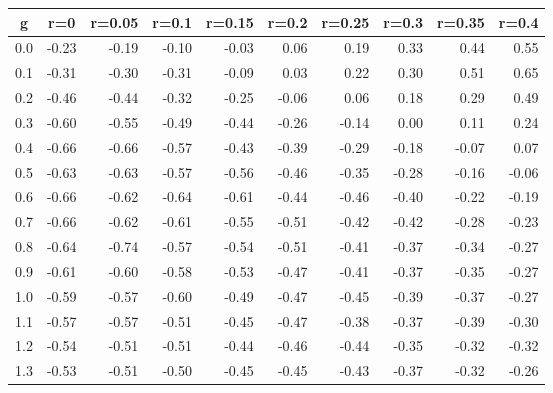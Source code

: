 %
\begin{table}[!tbp]
 \begin{center}
 \begin{tabular}{rrrrrrrrrr}\hline\hline
\multicolumn{1}{c}{g}&\multicolumn{1}{c}{r=0}&\multicolumn{1}{c}{r=0.05}&\multicolumn{1}{c}{r=0.1}&\multicolumn{1}{c}{r=0.15}&\multicolumn{1}{c}{r=0.2}&\multicolumn{1}{c}{r=0.25}&\multicolumn{1}{c}{r=0.3}&\multicolumn{1}{c}{r=0.35}&\multicolumn{1}{c}{r=0.4}\tabularnewline
\hline
0.0&-0.23&-0.19&-0.10&-0.03& 0.06& 0.19& 0.33& 0.44& 0.55\tabularnewline
0.1&-0.31&-0.30&-0.31&-0.09& 0.03& 0.22& 0.30& 0.51& 0.65\tabularnewline
0.2&-0.46&-0.44&-0.32&-0.25&-0.06& 0.06& 0.18& 0.29& 0.49\tabularnewline
0.3&-0.60&-0.55&-0.49&-0.44&-0.26&-0.14& 0.00& 0.11& 0.24\tabularnewline
0.4&-0.66&-0.66&-0.57&-0.43&-0.39&-0.29&-0.18&-0.07& 0.07\tabularnewline
0.5&-0.63&-0.63&-0.57&-0.56&-0.46&-0.35&-0.28&-0.16&-0.06\tabularnewline
0.6&-0.66&-0.62&-0.64&-0.61&-0.44&-0.46&-0.40&-0.22&-0.19\tabularnewline
0.7&-0.66&-0.62&-0.61&-0.55&-0.51&-0.42&-0.42&-0.28&-0.23\tabularnewline
0.8&-0.64&-0.74&-0.57&-0.54&-0.51&-0.41&-0.37&-0.34&-0.27\tabularnewline
0.9&-0.61&-0.60&-0.58&-0.53&-0.47&-0.41&-0.37&-0.35&-0.27\tabularnewline
1.0&-0.59&-0.57&-0.60&-0.49&-0.47&-0.45&-0.39&-0.37&-0.27\tabularnewline
1.1&-0.57&-0.57&-0.51&-0.45&-0.47&-0.38&-0.37&-0.39&-0.30\tabularnewline
1.2&-0.54&-0.51&-0.51&-0.44&-0.46&-0.44&-0.35&-0.32&-0.32\tabularnewline
1.3&-0.53&-0.51&-0.50&-0.45&-0.45&-0.43&-0.37&-0.32&-0.26\tabularnewline
\hline
\end{tabular}

\end{center}

\end{table}


